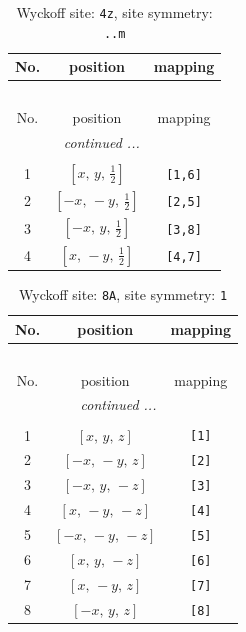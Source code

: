 \documentclass[fleqn,8pt]{jsarticle}
\begin{document}
\renewcommand{\arraystretch}{1.2}
\begin{longtable}{ccc}
\caption{Wyckoff site: {\tt 4z}, site symmetry: {\tt ..m}}
 \\
 \hline \hline
No. & position & mapping \\ \hline \endfirsthead

\multicolumn{2}{l}{\tablename\ \thetable{}} \\
 \hline \hline
No. & position & mapping \\ \hline \endhead

 \hline \hline
\multicolumn{2}{r}{\footnotesize\it continued ...} \\ \endfoot

 \hline \hline
\multicolumn{2}{r}{} \\ \endlastfoot

1 & $\left[ x,\, y,\, \frac{1}{2} \right]$ & {\tt [1,6]} \\ \hline
2 & $\left[ - x,\, - y,\, \frac{1}{2} \right]$ & {\tt [2,5]} \\ \hline
3 & $\left[ - x,\, y,\, \frac{1}{2} \right]$ & {\tt [3,8]} \\ \hline
4 & $\left[ x,\, - y,\, \frac{1}{2} \right]$ & {\tt [4,7]} \\
\end{longtable}
\renewcommand{\arraystretch}{1.2}
\begin{longtable}{ccc}
\caption{Wyckoff site: {\tt 8A}, site symmetry: {\tt 1}}
 \\
 \hline \hline
No. & position & mapping \\ \hline \endfirsthead

\multicolumn{2}{l}{\tablename\ \thetable{}} \\
 \hline \hline
No. & position & mapping \\ \hline \endhead

 \hline \hline
\multicolumn{2}{r}{\footnotesize\it continued ...} \\ \endfoot

 \hline \hline
\multicolumn{2}{r}{} \\ \endlastfoot

1 & $\left[ x,\, y,\, z \right]$ & {\tt [1]} \\ \hline
2 & $\left[ - x,\, - y,\, z \right]$ & {\tt [2]} \\ \hline
3 & $\left[ - x,\, y,\, - z \right]$ & {\tt [3]} \\ \hline
4 & $\left[ x,\, - y,\, - z \right]$ & {\tt [4]} \\ \hline
5 & $\left[ - x,\, - y,\, - z \right]$ & {\tt [5]} \\ \hline
6 & $\left[ x,\, y,\, - z \right]$ & {\tt [6]} \\ \hline
7 & $\left[ x,\, - y,\, z \right]$ & {\tt [7]} \\ \hline
8 & $\left[ - x,\, y,\, z \right]$ & {\tt [8]} \\
\end{longtable}
\end{document}
